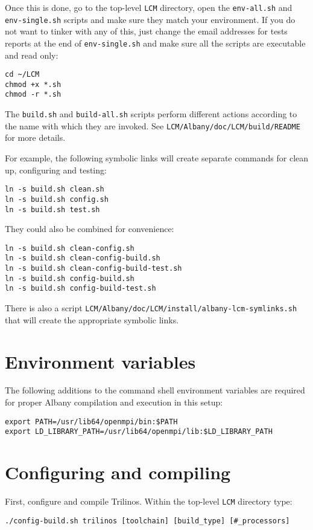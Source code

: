 \documentclass[10pt,a4paper]{article} \usepackage[utf8]{inputenc}
\begin{document}
Once this is done, go to the top-level \verb+LCM+ directory, open the
\verb+env-all.sh+ and \verb+env-single.sh+ scripts and make sure they match your
environment. If you do not want to tinker with any of this, just change the
email addresses for tests reports at the end of \verb+env-single.sh+ and make
sure all the scripts are executable and read only:
\begin{verbatim}
cd ~/LCM
chmod +x *.sh
chmod -r *.sh
\end{verbatim}

The \verb+build.sh+ and \verb+build-all.sh+ scripts perform different
actions according to the name with which they are invoked. See
\verb+LCM/Albany/doc/LCM/build/README+ for more details. 

For example, the following symbolic links will create separate
commands for clean up, configuring and testing:
\begin{verbatim}
ln -s build.sh clean.sh
ln -s build.sh config.sh
ln -s build.sh test.sh
\end{verbatim}
They could also be combined for convenience:
\begin{verbatim}
ln -s build.sh clean-config.sh
ln -s build.sh clean-config-build.sh
ln -s build.sh clean-config-build-test.sh
ln -s build.sh config-build.sh
ln -s build.sh config-build-test.sh
\end{verbatim}
There is also a script \verb+LCM/Albany/doc/LCM/install/albany-lcm-symlinks.sh+
that will create the appropriate symbolic links. 

\section{Environment variables}
The following additions to the command shell environment variables are
required for proper Albany compilation and execution in this setup:
\begin{verbatim}
export PATH=/usr/lib64/openmpi/bin:$PATH
export LD_LIBRARY_PATH=/usr/lib64/openmpi/lib:$LD_LIBRARY_PATH
\end{verbatim}

\section{Configuring and compiling}
First, configure and compile Trilinos. Within the top-level \verb+LCM+
directory type:
\begin{verbatim}
./config-build.sh trilinos [toolchain] [build_type] [#_processors]
\end{verbatim}
\end{document}
